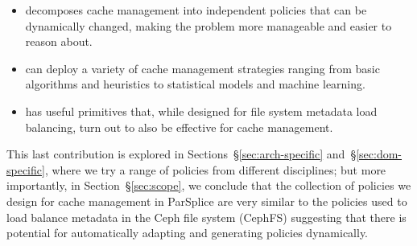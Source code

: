 \begin{itemize}

  \item decomposes cache management into independent policies that can be
  dynamically changed, making the problem more manageable and easier to reason
  about.

  \item can deploy a variety of cache management strategies ranging from basic
  algorithms and heuristics to statistical models and machine learning.

  \item has useful primitives that, while designed for file system metadata
  load balancing, turn out to also be effective for cache management. 

\end{itemize}


This last contribution is explored in Sections~\S\ref{sec:arch-specific}
and~\S\ref{sec:dom-specific}, where we try a range of policies from different
disciplines; but more importantly, in Section~\S\ref{sec:scope}, we conclude
that the collection of policies we design for cache management in ParSplice
are very similar to the policies used to load balance metadata in the Ceph file
system (CephFS) suggesting that there is potential for automatically adapting
and generating policies dynamically.  


